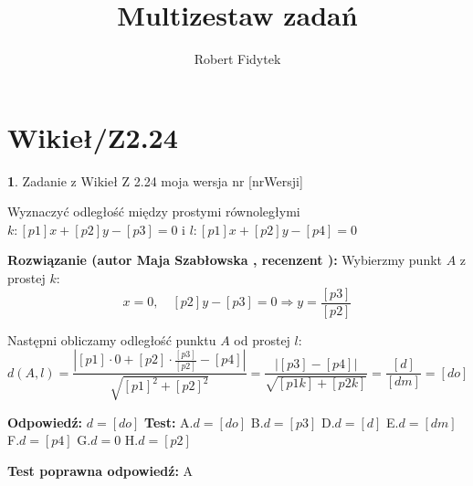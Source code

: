 \documentclass[12pt, a4paper]{article}
\title{Multizestaw zadań}
\author{Robert Fidytek}
\date{}
\theoremstyle{definition} %
\newtheorem{zad}{}
\newcommand{\kategoria}[1]{\section{#1}} %
\newcommand{\zadStart}[1]{\begin{zad}#1\newline} %
\newcommand{\zadStop}{\end{zad}}   %
\newcommand{\rozwStart}[2]{\noindent \textbf{Rozwiązanie (autor #1 , recenzent #2): }\newline} %
\newcommand{\rozwStop}{\newline}                                            %
\newcommand{\odpStart}{\noindent \textbf{Odpowiedź:}\newline}    %
\newcommand{\odpStop}{\newline}                                             %
\newcommand{\testStart}{\noindent \textbf{Test:}\newline} %
\newcommand{\testStop}{\newline} %
\newcommand{\kluczStart}{\noindent \textbf{Test poprawna odpowiedź:}\newline} %
\newcommand{\kluczStop}{\newline} %
\begin{document}
\maketitle


\kategoria{Wikieł/Z2.24}
\zadStart{Zadanie z Wikieł Z 2.24  moja wersja nr [nrWersji]}


Wyznaczyć odległość między prostymi równoległymi $k:[p1]x+[p2]y-[p3]=0$ i $l:[p1]x+[p2]y-[p4]=0$
\zadStop

\rozwStart{Maja Szabłowska}{}
Wybierzmy punkt $A$ z prostej $k$:
$$x=0, \quad [p2]y-[p3]=0 \Rightarrow y=\frac{[p3]}{[p2]}$$

Następni obliczamy odległość punktu $A$ od prostej $l$:
$$d(A,l)=\frac{|[p1]\cdot0+[p2]\cdot\frac{[p3]}{[p2]}-[p4]|}{\sqrt{[p1]^{2}+[p2]^{2}}}=\frac{|[p3]-[p4]|}{\sqrt{[p1k]+[p2k]}}=\frac{[d]}{[dm]}=[do]$$
\rozwStop


\odpStart
$d=[do]$
\odpStop
\testStart
A.$d=[do]$
B.$d=[p3]$
D.$d=[d]$
E.$d=[dm]$
F.$d=[p4]$
G.$d=0$
H.$d=[p2]$

\testStop
\kluczStart
A
\kluczStop
\end{document}
